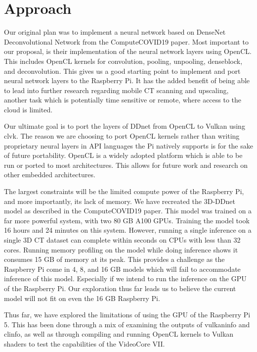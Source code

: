 \documentclass[conference]{IEEEtran}
\begin{document}
 \section{Approach}

 Our original plan was to implement a neural network based on DenseNet Deconvolutional Network from the ComputeCOVID19 paper.
 Most important to our proposal, is their implementation of the neural network layers using OpenCL. This includes 
 OpenCL kernels for convolution, pooling, unpooling, denseblock, and deconvolution. This gives us a good 
 starting point to implement and port neural network layers to the Raspberry Pi. It has the added benefit 
 of being able to lead into further research regarding mobile CT scanning and upscaling, another task which 
 is potentially time sensitive or remote, where access to the cloud is limited. 

 Our ultimate goal is to port the layers of DDnet from OpenCL to Vulkan using clvk. 
 The reason we are choosing to port OpenCL kernels rather than writing proprietary 
 neural layers in API languages the Pi natively supports is for the sake of future 
 portability. OpenCL is a widely adopted platform which is able to be run or ported to 
 most architectures. This allows for future work and research on other embedded architectures.

 The largest constraints will be the limited compute power of the Raspberry Pi, and more
 importantly, its lack of memory. We have recreated the 3D-DDnet model as described in the ComputeCOVID19 paper. 
 This model was trained on a far more powerful system, with two 80 GB A100 GPUs. Training the model took 16 hours 
 and 24 minutes on this system. However, running a single inference on a single 3D CT dataset can complete 
 within seconds on CPUs with less than 32 cores. Running memory profiling on the model while doing inference 
 shows it consumes 15 GB of memory at its peak. This provides a challenge as the Raspberry Pi come in 
 4, 8, and 16 GB models which will fail to accommodate inference of this model. Especially if we intend to run 
 the inference on the GPU of the Raspberry Pi. Our exploration thus far leads us to believe the current model 
 will not fit on even the 16 GB Raspberry Pi.

 Thus far, we have explored the limitations of using the GPU of the Raspberry Pi 5. 
 This has been done through a mix of examining the outputs of vulkaninfo and clinfo, 
 as well as through compiling and running OpenCL kernels to Vulkan shaders to test the 
 capabilities of the VideoCore VII. 
 
\end{document}
